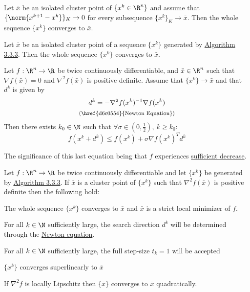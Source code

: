Let $\bar x$ be an isolated cluster point of $\{x^k\in\R^n\}$ and assume that
$\{\norm{x^{k+1}-x^k}\}_K\to0$ for every subsequence $\{x^k\}_K\to\bar x$. Then
the whole sequence $\{x^k\}$ converges to $\bar x$.

\label{aabc89a}

Let $\bar x$ be an isolated cluster point of a sequence $\{x^k\}$ generated by
\href{a7a5665}{Algorithm 3.3.3}. Then the whole sequence $\{x^k\}$ converges to
$\bar x$.

\label{d6d6148}

Let $f:\R^n\to\R$ be twice continuously differentiable, and $\bar x\in\R^n$
such that $\nabla f(\bar x)=0$ and $\nabla^2f(\bar x)$ is positive definite.
Assume that $\{x^k\}\to\bar x$ and that $d^k$ is given by
\begin{gather*}
  d^k = -\nabla^2f(x^k)^{-1}\nabla f(x^k) \\
  \text{\footnotesize{(\href{d6c0554}{Newton Equation})}}
\end{gather*}
Then there exists $k_0\in\N$ such that $\forall\sigma\in(0,\frac12),\ k\geq k_0$:
$$
  f(x^k+d^k)\leq f(x^k)+\sigma\nabla f(x^k)^Td^k
$$

The significance of this last equation being that $f$ experiences
\href{fefb024}{sufficient decrease}.

\label{e58830c}

Let $f:\R^n\to\R$ be twice continuously differentiable and let $\{x^k\}$ be
generated by \href{a7a5665}{Algorithm 3.3.3}. If $\bar x$ is a cluster point of
$\{x^k\}$ such that $\nabla^2f(\bar x)$ is positive definite then the following
hold:
\begin{enumerata}
  \item The whole sequence $\{x^k\}$ converges to $\bar x$ and $\bar x$ is a strict
  local minimizer of $f$.
  \item For all $k\in\N$ sufficiently large, the search direction $d^k$ will be
  determined through the \href{d6c0554}{Newton equation}.
  \item For all $k\in\N$ sufficiently large, the full step-size $t_k=1$ will be
  accepted
  \item $\{x^k\}$ converges superlinearly to $\bar x$
  \item If $\nabla^2f$ is locally Lipschitz then $\{\bar x\}$ converges to $\bar x$
  quadratically.
\end{enumerata}

